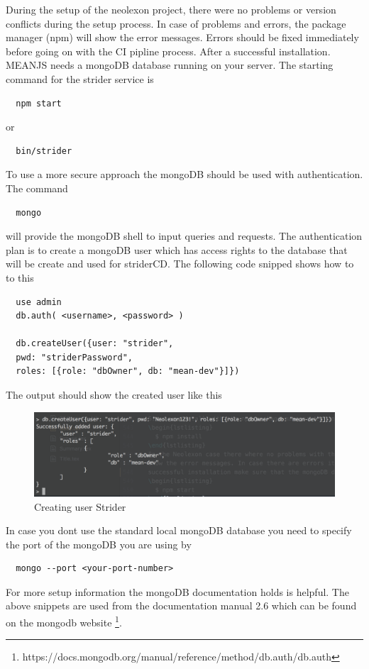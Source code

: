 During the setup of the neolexon project, there were no problems or version conflicts during the setup process. In case of problems and errors,
the package manager (npm) will show the error messages. Errors should be fixed immediately before going on with the CI pipline process. After a
successful installation. MEANJS needs a mongoDB database running on your server. The starting command for the strider service is
\begin{lstlisting}
  npm start
\end{lstlisting}
or
\begin{lstlisting}
  bin/strider
\end{lstlisting}
To use a more secure approach the mongoDB should be used with authentication. The command
\begin{lstlisting}
  mongo
\end{lstlisting}
will provide the mongoDB shell to input queries and requests. The authentication plan is to create a mongoDB user which has access
rights to the database that will be create and used for striderCD. The following code snipped shows how to to this
\begin{lstlisting}
  use admin
  db.auth( <username>, <password> )

  db.createUser({user: "strider",
  pwd: "striderPassword",
  roles: [{role: "dbOwner", db: "mean-dev"}]})
\end{lstlisting}
The output should show the created user like this
\begin{figure}[h!]
  \centering
  \includegraphics[width=1\textwidth]{images/createUser.png}
  \caption{Creating user Strider}
\end{figure}
In case you dont use the standard local mongoDB database you need to specify the port of the mongoDB you are using by
\begin{lstlisting}
  mongo --port <your-port-number>
\end{lstlisting}
For more setup information the mongoDB documentation holds is helpful. The above snippets are
used from the documentation manual 2.6 which can be found on the mongodb website \footnote{https://docs.mongodb.org/manual/reference/method/db.auth/db.auth}.

